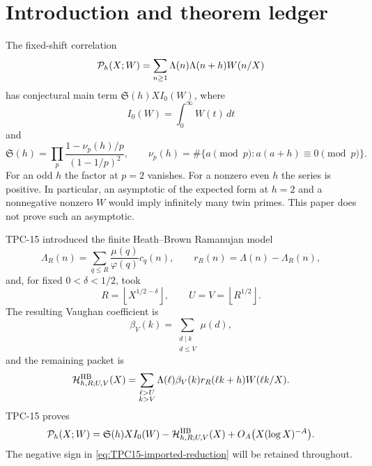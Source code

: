 \section{Introduction and theorem ledger}
\label{sec:introduction}

The fixed-shift correlation
\begin{equation}
 \mathcal P_h(X;W)=
 \sum_{n\ge1}\Lambda(n)\Lambda(n+h)W(n/X)
 \label{eq:prime-pair-form}
\end{equation}
has conjectural main term
$\mathfrak S(h)XI_0(W)$, where
\begin{equation}
 I_0(W)=\int_0^\infty W(t)\,dt
 \label{eq:I0-definition}
\end{equation}
and
\begin{equation}
 \mathfrak S(h)=
 \prod_p\frac{1-\nu_p(h)/p}{(1-1/p)^2},
 \qquad
 \nu_p(h)=\#\{a\pmod p:a(a+h)\equiv0\pmod p\}.
 \label{eq:pair-singular-series}
\end{equation}
For an odd $h$ the factor at $p=2$ vanishes.  For a nonzero even $h$ the
series is positive.  In particular, an asymptotic of the expected form at
$h=2$ and a nonnegative nonzero $W$ would imply infinitely many twin
primes.  This paper does not prove such an asymptotic.

TPC-15 \citep{WangTPC15} introduced the finite Heath--Brown Ramanujan
model
\begin{equation}
 \Lambda_R(n)=\sum_{q\le R}\frac{\mu(q)}{\varphi(q)}c_q(n),
 \qquad
 r_R(n)=\Lambda(n)-\Lambda_R(n),
 \label{eq:finite-model}
\end{equation}
and, for fixed $0<\delta<1/2$, took
\begin{equation}
 R=\left\lfloor X^{1/2-\delta}\right\rfloor,
 \qquad U=V=\left\lfloor R^{1/2}\right\rfloor.
 \label{eq:base-parameters}
\end{equation}
The resulting Vaughan coefficient is
\begin{equation}
 \beta_V(k)=\sum_{\substack{d\mid k\\d\le V}}\mu(d),
 \label{eq:betaV-intro}
\end{equation}
and the remaining packet is
\begin{equation}
 \mathcal H^{\rm HB}_{h,R;U,V}(X)
 =\sum_{\substack{\ell>U\\k>V}}
 \Lambda(\ell)\beta_V(k)r_R(\ell k+h)W(\ell k/X).
 \label{eq:TPC15-hard-packet}
\end{equation}
TPC-15 proves
\begin{equation}
 \mathcal P_h(X;W)=\mathfrak S(h)XI_0(W)
 -\mathcal H^{\rm HB}_{h,R;U,V}(X)
 +O_A\bigl(X(\log X)^{-A}\bigr).
 \label{eq:TPC15-imported-reduction}
\end{equation}
The negative sign in \eqref{eq:TPC15-imported-reduction} will be retained
throughout.

